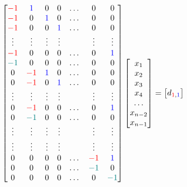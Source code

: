 \documentclass{article}
\begin{document}
\begin{equation*}
    \begin{bmatrix}
    \color{red}-1\color{black} & \color{blue}1\color{black} & 0 & 0 & \dots & 0 & 0\\
    \color{red}-1\color{black} & 0 & \color{blue}1\color{black} & 0 & \dots & 0 & 0\\
    \color{red}-1\color{black} & 0 & 0 & \color{blue}1\color{black} & \dots & 0 & 0\\
    \vdots & \vdots & \vdots & \vdots & & \vdots & \vdots \\
    \color{red}-1\color{black} & 0 & 0 & 0 & \dots & 0 & \color{blue}1\color{black}\\
    \color{teal}-1\color{black} & 0 & 0 & 0 & \dots & 0 & \color{black}0\color{black}\\
    0 & \color{red}-1\color{black} & \color{blue} 1\color{black} & 0 & \dots & 0 & 0 \\
    0 & \color{red}-1\color{black} & 0 & \color{blue}1\color{black} & \dots & 0 & 0\\
    \vdots & \vdots & \vdots & \vdots & & \vdots & \vdots\\
    0 & \color{red}-1\color{black} & 0 & 0 & \dots & 0 & \color{blue}1\color{black}\\
    0 & \color{teal}-1\color{black} & 0 & 0 & \dots & 0 & \color{black}0\color{black}\\
    \vdots & \vdots & \vdots & \vdots & & \vdots& \vdots \\
    \vdots & \vdots & \vdots & \vdots & & \vdots& \vdots \\
    0 & 0 & 0 & 0 & \dots & \color{red}-1\color{black} & \color{blue}1\color{black}\\
    0 & 0 & 0 & 0 & \dots  &\color{teal}-1\color{black} & 0 \\
    0 & 0 & 0 & 0 & \dots & 0 &\color{teal}-1\color{black} \\
    \end{bmatrix}
    \begin{bmatrix}
        x_{1} \\ x_{2} \\ x_{3} \\ x_{4} \\ \dots \\ x_{n-2} \\ x_{n-1}
    \end{bmatrix} = 
    \begin{bmatrix}
        d_{\color{red}1\color{black},\color{blue}1\color{black}} \\

\end{bmatrix}
\end{equation*}
\end{document}
